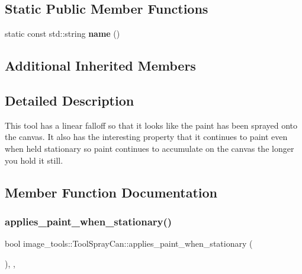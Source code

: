 \subsection*{Static Public Member Functions}
\begin{DoxyCompactItemize}
\item 
\mbox{\label{classimage__tools_1_1ToolSprayCan_af0beec74bf6527306e67688445571c29}} 
static const std\+::string {\bfseries name} ()
\end{DoxyCompactItemize}
\subsection*{Additional Inherited Members}


\subsection{Detailed Description}
This tool has a linear falloff so that it looks like the paint has been sprayed onto the canvas. It also has the interesting property that it continues to paint even when held stationary so paint continues to accumulate on the canvas the longer you hold it still. 

\subsection{Member Function Documentation}
\mbox{\label{classimage__tools_1_1ToolSprayCan_acd1e7907873ef757f200bf669d8dbfd9}} 
\subsubsection{\texorpdfstring{applies\+\_\+paint\+\_\+when\+\_\+stationary()}{applies\_paint\_when\_stationary()}}
{\footnotesize\ttfamily bool image\+\_\+tools\+::\+Tool\+Spray\+Can\+::applies\+\_\+paint\+\_\+when\+\_\+stationary (\begin{DoxyParamCaption}{ }\end{DoxyParamCaption})\hspace{0.3cm}{\ttfamily [inline]}, {\ttfamily [override]}, {\ttfamily [virtual]}}

